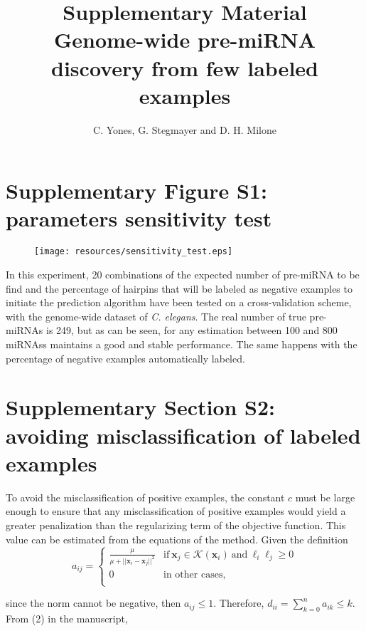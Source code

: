 \documentclass[]{scrartcl}
\title{Supplementary Material \\
	{\normalfont Genome-wide pre-miRNA discovery from few labeled examples}}
\date{}
\author{C. Yones, G. Stegmayer and D. H. Milone}
\affil{\small  Research Institute for Signals, Systems and Computational Intelligence, sinc(\textit{i}), FICH-UNL, CONICET, Santa Fe, Argentina.}
\begin{document}
\setcounter{page}{89}
\maketitle

\section*{Supplementary Figure S1: parameters sensitivity test}
	\begin{figure}[h!]
		\centering
		\texttt{[image: resources/sensitivity\_test.eps]}
		\label{fig:sensitivity_test}
	\end{figure}
	In this experiment, 20 combinations of the expected number of pre-miRNA to be find and the percentage of hairpins that will be labeled as negative examples to initiate the prediction algorithm have been tested on a cross-validation scheme, with the genome-wide dataset of \textit{C. elegans}. The real number of true pre-miRNAs is 249, but as can be seen, for any estimation between 100 and 800 miRNAss maintains a good and stable performance. The same happens with the percentage of negative examples automatically labeled.

\newpage
\section*{Supplementary Section S2: avoiding misclassification of labeled examples}

	To avoid the misclassification of positive examples, the constant $c$ must be large enough to ensure that any misclassification of positive examples would yield a greater penalization than the regularizing term of the objective function. This value can be estimated from the equations of the method. Given the definition
	\begin{equation} \tag{S.1}
		a_{ij} =
		\begin{cases}
			\frac{\mu}{\mu + ||\mathbf{x}_{i} - \mathbf{x}_{j}||^2} & \text{if} \ \mathbf{x}_{j} \in  \mathcal{K}(\mathbf{x}_{i}) \ \text{and} \ \ell_{i} \ell_{j} \geq 0 \\
			0 & \text{in other cases,} \\
		\end{cases}
	\end{equation}

	\noindent since the norm cannot be negative, then $a_{ij} \leq 1$. Therefore, $d_{ii} = \sum_{k=0}^n a_{ik} \leq k$. From (2) in the manuscript,
\end{document}
